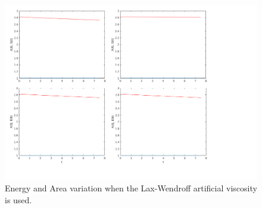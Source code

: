 \begin{figure}[Ht!]
\centering
\includegraphics[scale=0.6]{./TEXT/lax.png}
\caption{Energy and Area variation when the Lax-Wendroff artificial viscosity is used.}
\label{lax}
\end{figure}